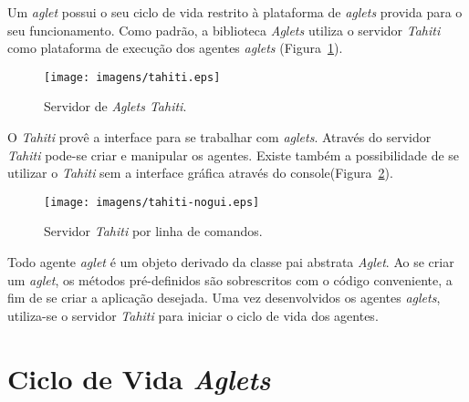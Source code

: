	Um \textit{aglet} possui o seu ciclo de vida restrito à plataforma de \textit{aglets} provida para o seu funcionamento. Como padrão, a biblioteca \textit{Aglets} utiliza o servidor \textit{Tahiti} como plataforma de execução dos agentes \textit{aglets} (Figura~\ref{fig:tahiti})\cite{ManualAglets}.

\begin{figure}[htb]
  \centerline{\texttt{[image: imagens/tahiti.eps]}}
  \caption{Servidor de \textit{Aglets Tahiti}.}
\label{fig:tahiti}
\end{figure}

	O \textit{Tahiti} provê a interface para se trabalhar com \textit{aglets}. Através do servidor \textit{Tahiti} pode-se criar e manipular os agentes. Existe também a possibilidade de se utilizar o \textit{Tahiti} sem a interface gráfica através do console(Figura~\ref{fig:tahiti_nogui}).

\begin{figure}
  \centerline{\texttt{[image: imagens/tahiti-nogui.eps]}}
  \caption{Servidor \textit{Tahiti} por linha de comandos.}
\label{fig:tahiti_nogui}
\end{figure}

	Todo agente \textit{aglet} é um objeto derivado da classe pai abstrata \textit{Aglet}. Ao se criar um \textit{aglet}, os métodos pré-definidos são sobrescritos com o código conveniente, a fim de se criar a aplicação desejada. Uma vez desenvolvidos os agentes \textit{aglets}, utiliza-se o servidor \textit{Tahiti} para iniciar o ciclo de vida dos agentes.


\section{Ciclo de Vida \textit{Aglets}}

